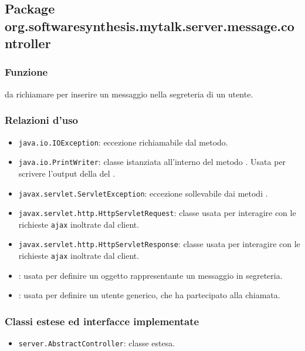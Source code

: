 \subsection{Package org.softwaresynthesis.mytalk.server.message.controller}\label{sec:messageServlet}


\subsubsection*{Funzione}
 da richiamare per inserire un messaggio nella segreteria di un utente.

\subsubsection*{Relazioni d'uso}
\begin{itemize}
	\item \texttt{java.io.IOException}: eccezione richiamabile dal metodo.
	\item \texttt{java.io.PrintWriter}: classe istanziata all'interno del metodo . Usata per scrivere l'output della del .
	\item \texttt{javax.servlet.ServletException}: eccezione sollevabile dai metodi .
	\item \texttt{javax.servlet.http.HttpServletRequest}: classe usata per interagire con le richieste \texttt{ajax} inoltrate dal client.
	\item \texttt{javax.servlet.http.HttpServletResponse}: classe usata per interagire con le richieste \texttt{ajax} inoltrate dal client.
	\item {}: usata per definire un oggetto rappresentante un messaggio in segreteria.
	\item {}: usata per definire un utente generico, che ha partecipato alla chiamata.
\end{itemize}

\subsubsection*{Classi estese ed interfacce implementate}
\begin{itemize}
	\item \texttt{server.AbstractController}: classe estesa.
\end{itemize}

